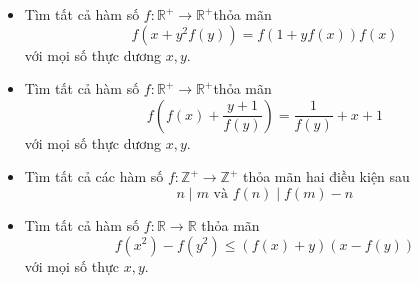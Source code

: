 \documentclass[11pt]{scrartcl}
\begin{document}
\begin{itemize}[label=, leftmargin=0em, itemsep=0.5em]
\begin{sol}
\begin{proof}
            Nhưng theo  thì $f$ không bị chặn trên và $\blim_{x \to +\infty}f(x) = +\infty$ nên dẫn tới vô lý.

            Suy ra $q = 1$ hay $d = 0 \ra a = b$. Thế nên $f$ đơn ánh trên $\bb{R^+}$.
        \end{proof}

        Từ $(1)$ thay $P\left(x,\frac{y}{f(x)}\right)$ suy ra \[x + f(y + 1) = xf\left(x + \frac{y}{f(x)}\right) + \frac{y}{f(x)}f(y) ,\xyro \]

        Cho $x = y = 1$ ta được $f(2) = f(1 + \frac{1}{f(1)})$. Vì $f$ đơn ánh nên $f(1) = 1$. 

        Từ $(1)$ thay $P(1,x) \ra f(x) = \frac{1}{x}, \xro$. Thử lại thì thỏa mãn. Vậy hàm duy nhất thỏa mãn là $\boxed{f(x) = \frac{1}{x}, \xro}$. 
       \end{sol}
    \item \begin{bt}
        Tìm tất cả hàm số $f: \mathbb{R}^{+} \rightarrow \mathbb{R}^{+}$thỏa mãn
        $$
        f\left(x+y^2 f(y)\right)=f(1+y f(x)) f(x)
        $$
        với mọi số thực dương $x, y$.
   \end{bt}
   \item \begin{bt}
    Tìm tất cả hàm số $f: \mathbb{R}^{+} \rightarrow \mathbb{R}^{+}$thỏa mãn
   $$
   f\left(f(x)+\frac{y+1}{f(y)}\right)=\frac{1}{f(y)}+x+1
   $$
   với mọi số thực dương $x, y$.
\end{bt}

    \item \begin{bt}
        Tìm tất cả các hàm số $f: \mathbb{Z}^+\rightarrow \mathbb{Z}^+$ thỏa mãn hai điều kiện sau
        \[
            n \mid m \text{ và }f(n) \mid f(m) - n
        \]
    \end{bt}
    
    \item \begin{btvn}
        Tìm tất cả hàm số $f: \mathbb{R} \rightarrow \mathbb{R}$ thỏa mãn
        $$
        f\left(x^2\right)-f\left(y^2\right) \leq(f(x)+y)(x-f(y))
        $$
        với mọi số thực $x, y$.
    \end{btvn}


\end{itemize}
\end{document}
